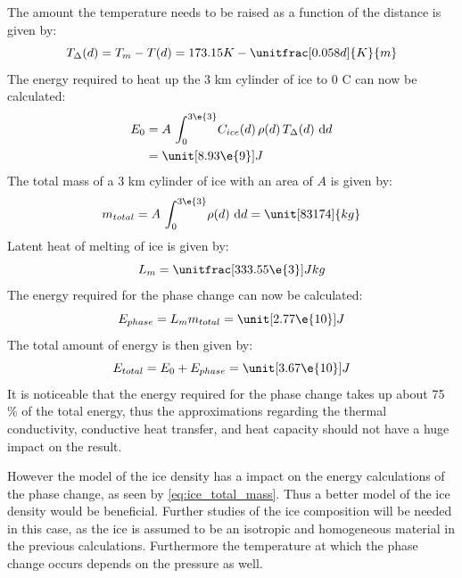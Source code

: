 
\noindent
The amount the temperature needs to be raised as a function of the distance is given by:
\begin{equation}\label{eq:T_diff}
	T_\Delta(d) = T_m - T(d) = 173.15 K - \unitfrac[0.058 d]{K}{m}
\end{equation}
The energy required to heat up the 3 km cylinder of ice to 0 \textdegree C can now be calculated:
\begin{align}
	E_0 &= A \, \int_0^{3\e{3}} \! C_{ice}(d) \, \rho(d) \, T_\Delta(d) \ \mathrm{d}d \\ \nonumber
	    &= \unit[8.93 \e{9}]{J}
\end{align}
The total mass of a 3 km cylinder of ice with an area of $A$ is given by:
\begin{equation}\label{eq:ice_total_mass}
	m_{total} = A \, \int_0^{3\e{3}} \! \rho(d) \ \mathrm{d}d = \unit[83174]{kg}
\end{equation}
Latent heat of melting of ice is given by\cite{website:waterLatentHeat}:
\begin{equation}
	L_m = \unitfrac[333.55 \e{3}]{J}{kg}
\end{equation}
The energy required for the phase change can now be calculated:
\begin{equation}
	E_{phase} = L_m m_{total} = \unit[2.77 \e{10}]{J}
\end{equation}
The total amount of energy is then given by:
\begin{equation}\label{eq:E_total}
	E_{total} = E_0 + E_{phase} = \unit[3.67 \e{10}]{J}
\end{equation}
It is noticeable that the energy required for the phase change takes up about 75 \% of the total energy, thus the approximations regarding the thermal conductivity, conductive heat transfer, and heat capacity should not have a huge impact on the result.

However the model of the ice density has a impact on the energy calculations of the phase change, as seen by \eqref{eq:ice_total_mass}. Thus a better model of the ice density would be beneficial. Further studies of the ice composition will be needed in this case, as the ice is assumed to be an isotropic and homogeneous material in the previous calculations. Furthermore the temperature at which the phase change occurs depends on the pressure as well.

